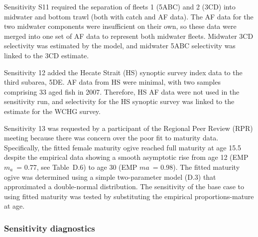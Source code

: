 \documentclass[11pt]{book}
\begin{document}
Sensitivity S11 required the separation of fleets 1 (5ABC) and 2 (3CD) into midwater and bottom trawl (both with catch and AF data).
The AF data for the two midwater components were insufficient on their own, so these data were merged into one set of AF data to represent both midwater fleets.
Midwater 3CD selectivity was estimated by the model, and midwater 5ABC selectivity was linked to the 3CD estimate.

Sensitivity 12 added the Hecate Strait (HS) synoptic survey index data to the third subarea, 5DE.
AF data from HS were minimal, with two samples comprising 33 aged fish in 2007.
Therefore, HS AF data were not used in the sensitivity run, and selectivity for the HS synoptic survey was linked to the estimate for the WCHG survey.

Sensitivity 13 was requested by a participant of the Regional Peer Review (RPR) meeting because there was concern over the poor fit to maturity data.
Specifically, the fitted female maturity ogive reached full maturity at age 15.5 despite the empirical data showing a smooth asymptotic rise from age 12 (EMP $m_a$~= 0.77, see Table~D.6) to age 30 (EMP $ma$~= 0.98).
The fitted maturity ogive was determined using a simple two-parameter model (D.3) that approximated a double-normal distribution.
The sensitivity of the base case to using fitted maturity was tested by substituting the empirical proportions-mature at age.

\subsubsection{Sensitivity diagnostics}
\end{document}
